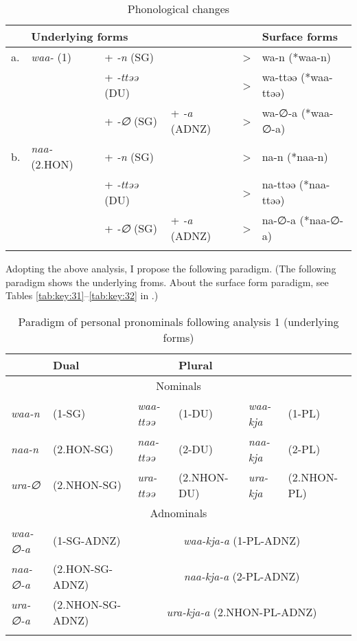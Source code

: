 \begin{table}
\caption{\label{tab:key:35}Phonological changes}
\begin{tabular}{ *{6}{l} }
\lsptoprule
   & \multicolumn{3}{l}{Underlying forms} & & \multicolumn{1}{l}{Surface forms}\\\midrule
a. & \textit{waa-} (1)     & +  \textit{{}-n}    (SG) &                        & > & wa-n    (*waa-n)   \\
   &                       & +  \textit{{}-ttəə} (DU) &                        & > & wa-ttəə (*waa-ttəə)\\
   &                       & +  \textit{{}-∅}    (SG) & + \textit{{}-a} (ADNZ) & > & wa-∅-a  (*waa-∅-a) \\
b. & \textit{naa-} (2.HON) & +  \textit{{}-n}    (SG) &                        & > & na-n    (*naa-n)   \\
   &                       & +  \textit{{}-ttəə} (DU) &                        & > & na-ttəə (*naa-ttəə)\\
   &                       & +  \textit{{}-∅}    (SG) & + \textit{{}-a} (ADNZ) & > & na-∅-a  (*naa-∅-a) \\
\lspbottomrule
\end{tabular}
\end{table}

Adopting the above analysis, I propose the following paradigm. (The following paradigm shows the underlying froms. About the surface form paradigm, see Tables \ref{tab:key:31}--\ref{tab:key:32} in .)

\begin{table}
\caption{\label{tab:key:36}Paradigm of personal pronominals following analysis 1 (underlying forms)}
\begin{tabular}{l@{ }ll@{ }ll@{ }l}
\lsptoprule
\multicolumn{2}{l}{Singular} & \multicolumn{2}{l}{Dual} & \multicolumn{2}{l}{Plural}\\\midrule
\multicolumn{6}{c}{Nominals}\\\midrule
           \textit{waa-n} & (1-SG)               & \textit{waa-ttəə} & (1-DU)      & \textit{waa-kja}  & (1-PL)\\
           \textit{naa-n} &  (2.HON-SG)          & \textit{naa-ttəə} & (2-DU)      & \textit{naa-kja}  & (2-PL)\\
           \textit{ura-∅} &  (2.NHON-SG)         & \textit{ura-ttəə} & (2.NHON-DU) & \textit{ura-kja}  & (2.NHON-PL)\\\midrule
\multicolumn{6}{c}{Adnominals}\\\midrule
           \textit{waa-∅-a} &  (1-SG-ADNZ)       & \multicolumn{4}{c}{\textit{waa-kja-a} (1-PL-ADNZ)}\\ 
           \textit{naa-∅-a} & (2.HON-SG-ADNZ)    & \multicolumn{4}{c}{\textit{naa-kja-a} (2-PL-ADNZ)}\\
           \textit{ura-∅-a} &  (2.NHON-SG-ADNZ)  & \multicolumn{4}{c}{\textit{ura-kja-a} (2.NHON-PL-ADNZ)}\\
\lspbottomrule
\end{tabular}
\end{table}

